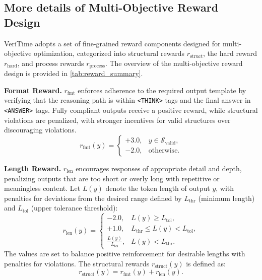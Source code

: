 \documentclass{article}
\theoremstyle{plain}
\theoremstyle{definition}
\theoremstyle{remark}
\begin{document}
\subsection{More details of Multi-Objective Reward Design}

VeriTime adopts a set of fine-grained reward components designed for multi-objective optimization, categorized into structural rewards \(r_{\text{struct}}\), the hard reward \(r_{\text{hard}}\), and process rewards \(r_{\text{process}}\). The overview of the multi-objective reward design is provided in \autoref{tab:reward_summary}. 

\textbf{Format Reward.} $r_{\text{fmt}}$ enforces adherence to the required output template by verifying that the reasoning path is within \texttt{<THINK>} tags and the final answer in \texttt{<ANSWER>} tags. Fully compliant outputs receive a positive reward, while structural violations are penalized, with stronger incentives for valid structures over discouraging violations.
 \begin{equation}
r_{\text{fmt}}(y) =
\begin{cases}
+3.0, & y \in \mathcal{S}_{\text{valid}}, \\
-2.0, & \text{otherwise}.
\end{cases}
\label{eq:format_reward}
\end{equation}

\textbf{Length Reward.} $r_{\text{len}}$ encourages responses of appropriate detail and depth, penalizing outputs that are too short or overly long with repetitive or meaningless content. Let \(L(y)\) denote the token length of output \(y\), with penalties for deviations from the desired range defined by \(L_{\text{thr}}\) (minimum length) and \(L_{\text{tol}}\) (upper tolerance threshold): 
\begin{equation}
r_{\text{len}}(y) =
\begin{cases}
-2.0, & L(y) \ge L_{\text{tol}}, \\
+1.0, & L_{\text{thr}} \le L(y) < L_{\text{tol}}, \\
\frac{L(y)}{L_{\text{tol}}}, & L(y) < L_{\text{thr}}.
\end{cases}
\label{eq:length_reward}
\end{equation}
The values are set to balance positive reinforcement for desirable lengths with penalties for violations. The structural rewards \(r_{\text{struct}}(y)\) is defined as:
\begin{equation}
r_{\text{struct}}(y) = r_{\text{fmt}}(y) + r_{\text{len}}(y).
\end{equation}
\end{document}
